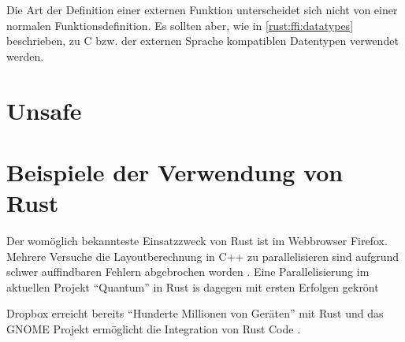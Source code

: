 Die Art der Definition einer externen Funktion unterscheidet sich nicht von einer normalen Funktionsdefinition. Es sollten aber, wie in \autoref{rust:ffi:datatypes} beschrieben, zu C bzw. der externen Sprache kompatiblen Datentypen verwendet werden.


\section{Unsafe}



\section{Beispiele der Verwendung von Rust}

Der womöglich bekannteste Einsatzzweck von Rust ist im Webbrowser Firefox.
Mehrere Versuche die Layoutberechnung in C++ zu parallelisieren sind aufgrund schwer auffindbaren Fehlern abgebrochen worden \cite{rust:example:firefox}.
Eine Parallelisierung im aktuellen Projekt \enquote{Quantum} in Rust is dagegen mit ersten Erfolgen gekrönt \cite{rust:example:firefox_heise}

Dropbox erreicht bereits \enquote{Hunderte Millionen von Geräten} mit Rust und das GNOME Projekt ermöglicht die Integration von Rust Code \cite{rust:example:two_years}.


 



